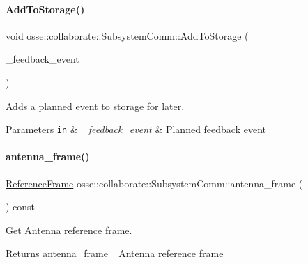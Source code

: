 \paragraph{\texorpdfstring{Add\+To\+Storage()}{AddToStorage()}\hspace{0.1cm}{\footnotesize\ttfamily [2/2]}}
{\footnotesize\ttfamily void osse\+::collaborate\+::\+Subsystem\+Comm\+::\+Add\+To\+Storage (\begin{DoxyParamCaption}\item[{\hyperlink{structosse_1_1collaborate_1_1_subsystem_comm_1_1_feedback_event}{Subsystem\+Comm\+::\+Feedback\+Event}}]{\+\_\+feedback\+\_\+event }\end{DoxyParamCaption})}



Adds a planned event to storage for later. 


\begin{DoxyParams}[1]{Parameters}
\mbox{\tt in}  & {\em \+\_\+feedback\+\_\+event} & Planned feedback event \\
\hline
\end{DoxyParams}
\mbox{\label{classosse_1_1collaborate_1_1_subsystem_comm_a8e4f0338a3fb3d26a620316938c02cbd}} 
\paragraph{\texorpdfstring{antenna\+\_\+frame()}{antenna\_frame()}}
{\footnotesize\ttfamily \hyperlink{classosse_1_1collaborate_1_1_reference_frame}{Reference\+Frame} osse\+::collaborate\+::\+Subsystem\+Comm\+::antenna\+\_\+frame (\begin{DoxyParamCaption}{ }\end{DoxyParamCaption}) const\hspace{0.3cm}{\ttfamily [inline]}}



Get \hyperlink{classosse_1_1collaborate_1_1_antenna}{Antenna} reference frame. 

\begin{DoxyReturn}{Returns}
antenna\+\_\+frame\+\_\+ \hyperlink{classosse_1_1collaborate_1_1_antenna}{Antenna} reference frame 
\end{DoxyReturn}
\mbox{\label{classosse_1_1collaborate_1_1_subsystem_comm_a19ba433f23b428c1864f33e3b8588639}} 
